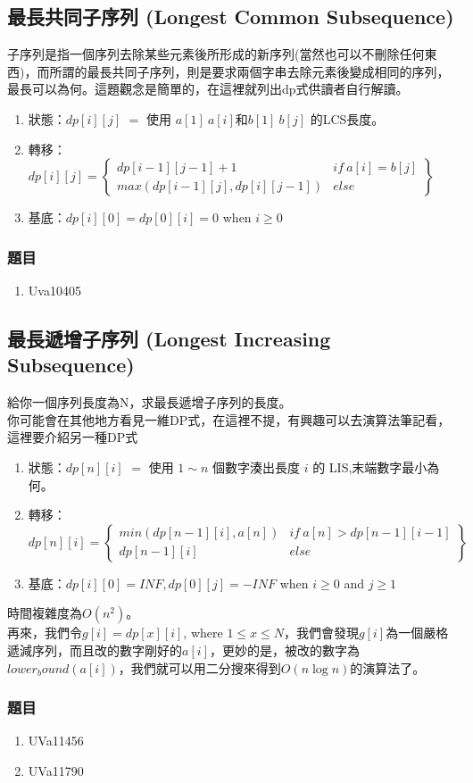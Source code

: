 \subsection{最長共同子序列 (Longest Common Subsequence)}
子序列是指一個序列去除某些元素後所形成的新序列(當然也可以不刪除任何東西)，而所謂的最長共同子序列，則是要求兩個字串去除元素後變成相同的序列，最長可以為何。這題觀念是簡單的，在這裡就列出dp式供讀者自行解讀。
\begin{enumerate}
\item 狀態：$dp[i][j]$ $=$ 使用 $a[1]~a[i]$和$b[1]~b[j]$ 的LCS長度。
\item 轉移：$dp[i][j] =\left\{ \begin{array}{cc}
dp[i-1][j-1]+1 & if\ a[i]=b[j]\\
max(dp[i-1][j],dp[i][j-1]) & else
\end{array} \right\}$
\item 基底：$dp[i][0]=dp[0][i]=0$ when $i \geq 0$
\end{enumerate}
\subsubsection{題目}
\begin{enumerate}
\item Uva10405
\end{enumerate}
\subsection{最長遞增子序列 (Longest Increasing Subsequence)}
給你一個序列長度為N，求最長遞增子序列的長度。\\
你可能會在其他地方看見一維DP式，在這裡不提，有興趣可以去演算法筆記看，這裡要介紹另一種DP式
\begin{enumerate}
\item 狀態：$dp[n][i]$ $=$ 使用 $1 ∼ n$ 個數字湊出長度 $i$ 的 LIS,末端數字最小為何。
\item 轉移：$dp[n][i] =\left\{ \begin{array}{cc}
min(dp[n-1][i],a[n]) & if\ a[n]>dp[n-1][i-1]\\
dp[n-1][i] & else
\end{array} \right\}$
\item 基底：$dp[i][0] = INF, dp[0][j] = −INF$ when $i \geq 0$ and $j \geq 1$
\end{enumerate}
時間複雜度為$O(n^2)$。\\
再來，我們令$g[i]=dp[x][i]$, where $1\leq x \leq N$，我們會發現$g[i]$為一個嚴格遞減序列，而且改的數字剛好的$a[i]$，更妙的是，被改的數字為$lower_bound(a[i])$，我們就可以用二分搜來得到$O(n\log n)$的演算法了。

\subsubsection{題目}
\begin{enumerate}
\item UVa11456
\item UVa11790
\end{enumerate}